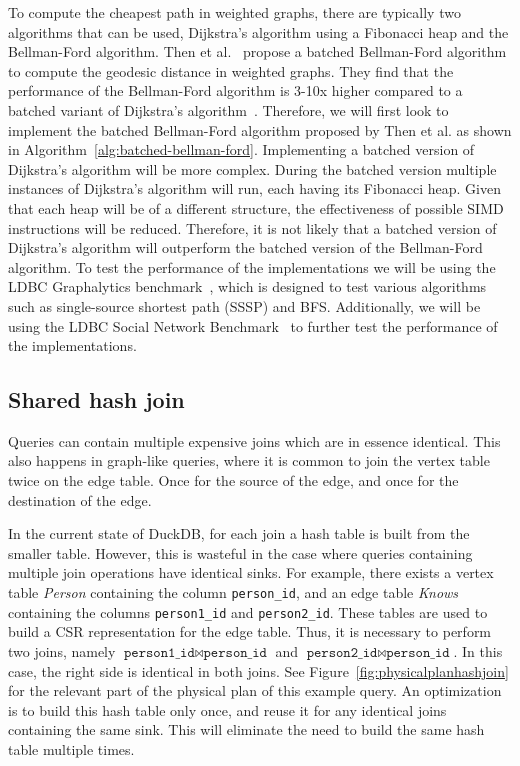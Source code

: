 To compute the cheapest path in weighted graphs, there are typically two algorithms that can be used, Dijkstra's algorithm using a Fibonacci heap and the Bellman-Ford algorithm.
Then et al.~\cite{DBLP:journals/dbsk/ThenGKN17} propose a batched Bellman-Ford algorithm to compute the geodesic distance in weighted graphs. 
They find that the performance of the Bellman-Ford algorithm is 3-10x higher compared to a batched variant of Dijkstra's algorithm~\cite{DBLP:journals/dbsk/ThenGKN17}.
Therefore, we will first look to implement the batched Bellman-Ford algorithm proposed by Then et al. as shown in Algorithm~\ref{alg:batched-bellman-ford}. 
Implementing a batched version of Dijkstra's algorithm will be more complex.
During the batched version multiple instances of Dijkstra's algorithm will run, each having its Fibonacci heap.
Given that each heap will be of a different structure, the effectiveness of possible SIMD instructions will be reduced. 
Therefore, it is not likely that a batched version of Dijkstra's algorithm will outperform the batched version of the Bellman-Ford algorithm. 
To test the performance of the implementations we will be using the LDBC Graphalytics benchmark~\cite{DBLP:journals/pvldb/IosupHNHPMCCSAT16}, which is designed to test various algorithms such as single-source shortest path (SSSP) and BFS.
Additionally, we will be using the LDBC Social Network Benchmark~\cite{DBLP:journals/corr/abs-2001-02299} to further test the performance of the implementations.


\subsection{Shared hash join}
Queries can contain multiple expensive joins which are in essence identical. This also happens in graph-like queries, where it is common to join the vertex table twice on the edge table. Once for the source of the edge, and once for the destination of the edge. 

In the current state of DuckDB, for each join a hash table is built from the smaller table. 
However, this is wasteful in the case where queries containing multiple join operations have identical sinks. 
For example, there exists a vertex table \textit{Person} containing the column \texttt{person\_id}, and an edge table \textit{Knows} containing the columns \texttt{person1\_id} and \texttt{person2\_id}. These tables are used to build a CSR representation for the edge table. 
Thus, it is necessary to perform two joins, namely $\texttt{person1\_id} \Join \texttt{person\_id}$ and $\texttt{person2\_id} \Join \texttt{person\_id}$. 
In this case, the right side is identical in both joins. 
See Figure~\ref{fig:physicalplanhashjoin} for the relevant part of the physical plan of this example query.
An optimization is to build this hash table only once, and reuse it for any identical joins containing the same sink. 
This will eliminate the need to build the same hash table multiple times.

